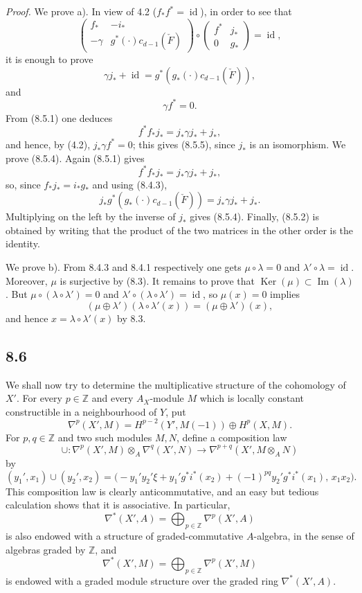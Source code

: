 \documentclass[11pt]{article}
\providecommand{\Ker}{\operatorname{Ker}}
\providecommand{\Ker}{\operatorname{Ker}}
\providecommand{\Ker}{\operatorname{Ker}}
\begin{document}
\emph{Proof.} We prove a). In view of 4.2 ($f_*f^*=\operatorname{id}$), in order to see that
\[
\begin{pmatrix}
f_*&-i_*\\
-\gamma&g^*(\cdot)c_{d-1}(\check F)
\end{pmatrix}
\circ
\begin{pmatrix}
f^*&j_*\\
0&g_*
\end{pmatrix}
=\operatorname{id},
\]
it is enough to prove
\[
\gamma j_*+\operatorname{id}=g^*(g_*(\cdot)c_{d-1}(\check F)),
\tag{8.5.4}
\]
and
\[
\gamma f^*=0.
\tag{8.5.5}
\]
From (8.5.1) one deduces
\[
f^*f_*j_*=j_*\gamma j_*+j_*,
\]
and hence, by (4.2), $j_*\gamma f^*=0$; this gives (8.5.5), since $j_*$ is an isomorphism. We prove (8.5.4). Again (8.5.1) gives
\[
f^*f_*j_*=j_*\gamma j_*+j_*,
\]
so, since $f_*j_*=i_*g_*$ and using (8.4.3),
\[
j_*g^*(g_*(\cdot)c_{d-1}(\check F))=j_*\gamma j_*+j_*.
\]
Multiplying on the left by the inverse of $j_*$ gives (8.5.4). Finally, (8.5.2) is obtained by writing that the product of the two matrices in the other order is the identity.

We prove b). From 8.4.3 and 8.4.1 respectively one gets $\mu\circ\lambda=0$ and $\lambda'\circ\lambda=\operatorname{id}$. Moreover, $\mu$ is surjective by (8.3). It remains to prove that $\Ker(\mu)\subset\operatorname{Im}(\lambda)$. But $\mu\circ(\lambda\circ\lambda')=0$ and $\lambda'\circ(\lambda\circ\lambda')=\operatorname{id}$, so $\mu(x)=0$ implies
\[
(\mu\oplus\lambda')(\lambda\circ\lambda'(x))=(\mu\oplus\lambda')(x),
\]
and hence $x=\lambda\circ\lambda'(x)$ by 8.3.

\subsection*{8.6}

We shall now try to determine the multiplicative structure of the cohomology of $X'$. For every $p\in\mathbb Z$ and every $A_X$-module $M$ which is locally constant constructible in a neighbourhood of $Y$, put
\[
\nabla^p(X',M)=H^{p-2}(Y',M(-1))\oplus H^p(X,M).
\]
For $p,q\in\mathbb Z$ and two such modules $M,N$, define a composition law
\[
\cup:\nabla^p(X',M)\otimes_A\nabla^q(X',N)\to
\nabla^{p+q}(X',M\otimes_A N)
\tag{8.6.1}
\]
by
\[
(y_1',x_1)\cup(y_2',x_2)=
\bigl(-y_1'y_2'\xi+y_1'g^*i^*(x_2)+(-1)^{pq}y_2'g^*i^*(x_1),\,x_1x_2\bigr).
\tag{8.6.2}
\]
This composition law is clearly anticommutative, and an easy but tedious calculation shows that it is associative. In particular,
\[
\nabla^*(X',A)=\bigoplus_{p\in\mathbb Z}\nabla^p(X',A)
\]
is also endowed with a structure of graded-commutative $A$-algebra, in the sense of algebras graded by $\mathbb Z$, and
\[
\nabla^*(X',M)=\bigoplus_{p\in\mathbb Z}\nabla^p(X',M)
\]
is endowed with a graded module structure over the graded ring $\nabla^*(X',A)$.
\end{document}
